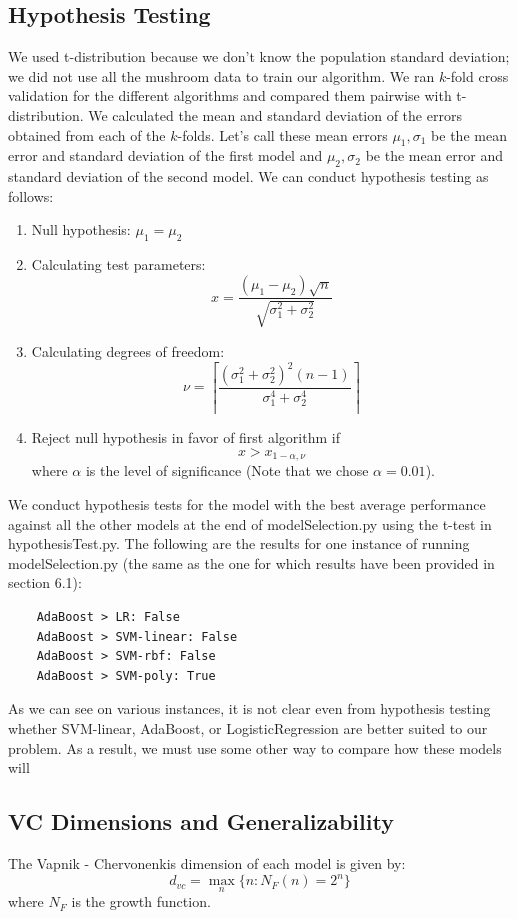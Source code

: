 \documentclass[fleqn]{article}
\begin{document}
    \subsection{Hypothesis Testing}
    We used t-distribution because we don’t know the population standard deviation; we did
    not use all the mushroom data to train our algorithm. We ran $k$-fold cross validation
    for the different algorithms and compared them pairwise with t-distribution. We
    calculated the mean and standard deviation of the errors obtained from each of the
    $k$-folds. Let's call these mean errors $ \mu_1, \sigma_1 $ be the mean error and standard
    deviation of the first model and $ \mu_2, \sigma_2 $ be the mean error and standard
    deviation of the second model. We can conduct hypothesis testing as follows:
    \begin{enumerate}
        \item Null hypothesis: $ \mu_1= \mu_2 $
        \item Calculating test parameters:
            $$ x = \frac{(\mu_1-\mu_2)\sqrt{n}}{\sqrt{\sigma_1^2 + \sigma_2^2}} $$
        \item Calculating degrees of freedom:
            $$ \nu = \left\lceil \frac{(\sigma_1^2 + \sigma_2^2)^2 (n-1)}{\sigma_1^4 + \sigma_2^4} \right\rceil $$
        \item Reject null hypothesis in favor of first algorithm if
            $$ x > x_{1-\alpha, \nu} $$
            where $ \alpha $ is the level of significance (Note that we chose $ \alpha = 0.01 $).
    \end{enumerate}
    We conduct hypothesis tests for the model with the best average performance against all
    the other models at the end of modelSelection.py using the t-test in hypothesisTest.py.
    The following are the results for one instance of running modelSelection.py (the same
    as the one for which results have been provided in section 6.1):
    \begin{lstlisting}
    AdaBoost > LR: False
    AdaBoost > SVM-linear: False
    AdaBoost > SVM-rbf: False
    AdaBoost > SVM-poly: True
    \end{lstlisting}
    As we can see on various instances, it is not clear even from hypothesis testing whether
    SVM-linear, AdaBoost, or LogisticRegression are better suited to our problem. As a result,
    we must use some other way to compare how these models will

    \subsection{VC Dimensions and Generalizability}
    The Vapnik - Chervonenkis dimension of each model is given by:
        $$ d_{vc} = \max_n\{n: N_F(n)=2^n\} $$
    where $ N_F $ is the growth function.\\
\end{document}
